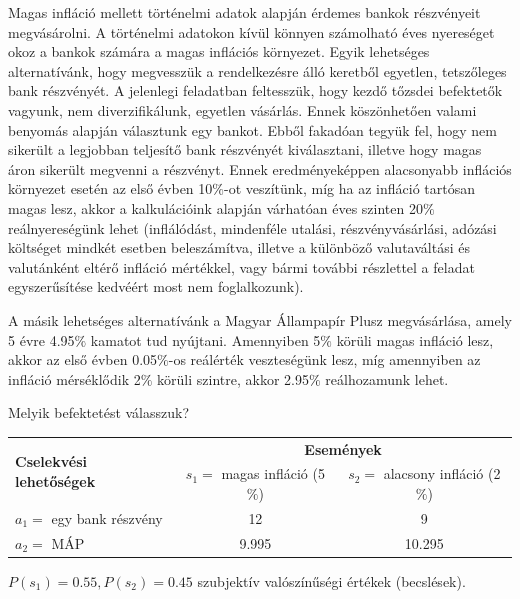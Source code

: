 \documentclass[a4paper,12pt]{article}
\begin{document}
Magas infláció mellett történelmi adatok alapján érdemes bankok részvényeit megvásárolni. A történelmi adatokon kívül könnyen számolható éves nyereséget okoz a bankok számára a magas inflációs környezet. Egyik lehetséges alternatívánk, hogy megvesszük a rendelkezésre álló keretből egyetlen, tetszőleges bank részvényét. A jelenlegi feladatban feltesszük, hogy kezdő tőzsdei befektetők vagyunk, nem diverzifikálunk, egyetlen vásárlás. Ennek köszönhetően valami benyomás alapján választunk egy bankot. Ebből fakadóan tegyük fel, hogy nem sikerült a legjobban teljesítő bank részvényét kiválasztani, illetve hogy magas áron sikerült megvenni a részvényt. Ennek eredményeképpen alacsonyabb inflációs környezet esetén az első évben 10$\%$-ot veszítünk, míg ha az infláció tartósan magas lesz, akkor a kalkulációink alapján várhatóan éves szinten 20$\%$ reálnyereségünk lehet (inflálódást, mindenféle utalási, részvényvásárlási, adózási költséget mindkét esetben beleszámítva, illetve a különböző valutaváltási és valutánként eltérő infláció mértékkel, vagy bármi további részlettel a feladat egyszerűsítése kedvéért most nem foglalkozunk).

A másik lehetséges alternatívánk a Magyar Állampapír Plusz megvásárlása, amely 5 évre 4.95$\%$ kamatot tud nyújtani. Amennyiben 5$\%$ körüli magas infláció lesz, akkor az első évben 0.05$\%$-os reálérték veszteségünk lesz, míg amennyiben az infláció mérséklődik 2$\%$ körüli szintre, akkor 2.95$\%$ reálhozamunk lehet.

Melyik befektetést válasszuk?

\begin{center}
\begin{tabular}{l|c|c}
\multirow{2}{*}{\bf Cselekvési lehetőségek } &  \multicolumn{2}{c}{ \bf Események }\\
 & $s_1=$ magas infláció (5$\%$) & $s_2=$ alacsony infláció (2$\%$) \\
\hline
  $a_1=$ egy bank részvény & 12 & 9 \\
  $a_2=$ MÁP & 9.995 & 10.295 \\
\end{tabular}
\end{center}
$P(s_1) = 0.55 , P(s_2) = 0.45$ szubjektív valószínűségi értékek (becslések).


\end{document}

